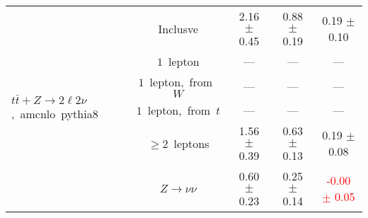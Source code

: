 \documentclass{article}
\begin{document}
\begin{longtable}{|l|c|c|c|c|}
\hline 
\multirow{6}{*}{$t\bar{t}+Z{\rightarrow}2{\ell}2{\nu}$,~amcnlo~pythia8} & Inclusve  & 2.16 $\pm$ 0.45  & 0.88 $\pm$ 0.19  & 0.19 $\pm$ 0.10 \\* 
 & $1$~lepton  & ---  & ---  & --- \\* 
 & $1$~lepton,~from~$W$  & ---  & ---  & --- \\* 
 & $1$~lepton,~from~$t$  & ---  & ---  & --- \\* 
 & $\ge2$~leptons  & 1.56 $\pm$ 0.39  & 0.63 $\pm$ 0.13  & 0.19 $\pm$ 0.08 \\* 
 & $Z\rightarrow\nu\nu$  & 0.60 $\pm$ 0.23  & 0.25 $\pm$ 0.14  & \textcolor{red}{ -0.00 $\pm$ 0.05 } \\* 
\hline 
\end{longtable} 

 
 
 
 
\pagebreak 

 
 
 
 
\end{document}
